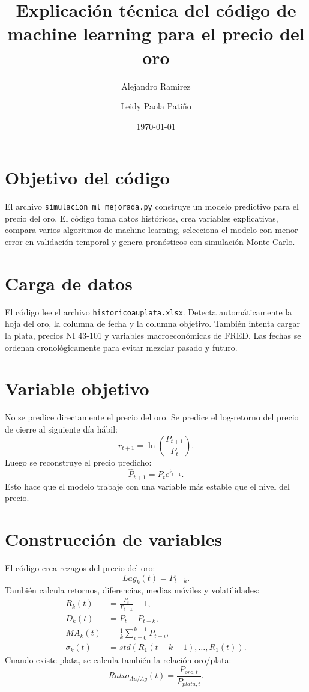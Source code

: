 \documentclass[12pt,letterpaper]{article}
\title{Explicación técnica del código de machine learning para el precio del oro}
\author{Alejandro Ramirez \and Leidy Paola Patiño}
\date{\today}
\begin{document}
\maketitle

\section{Objetivo del código}
El archivo \texttt{simulacion\_ml\_mejorada.py} construye un modelo predictivo para el precio del oro. El código toma datos históricos, crea variables explicativas, compara varios algoritmos de machine learning, selecciona el modelo con menor error en validación temporal y genera pronósticos con simulación Monte Carlo.

\section{Carga de datos}
El código lee el archivo \texttt{historicoauplata.xlsx}. Detecta automáticamente la hoja del oro, la columna de fecha y la columna objetivo. También intenta cargar la plata, precios NI 43-101 y variables macroeconómicas de FRED. Las fechas se ordenan cronológicamente para evitar mezclar pasado y futuro.

\section{Variable objetivo}
No se predice directamente el precio del oro. Se predice el log-retorno del precio de cierre al siguiente día hábil:
\begin{equation}
r_{t+1}=\ln\left(\frac{P_{t+1}}{P_t}\right).
\end{equation}
Luego se reconstruye el precio predicho:
\begin{equation}
\hat{P}_{t+1}=P_t e^{\hat{r}_{t+1}}.
\end{equation}
Esto hace que el modelo trabaje con una variable más estable que el nivel del precio.

\section{Construcción de variables}
El código crea rezagos del precio del oro:
\begin{equation}
Lag_k(t)=P_{t-k}.
\end{equation}
También calcula retornos, diferencias, medias móviles y volatilidades:
\begin{align}
R_k(t)&=\frac{P_t}{P_{t-k}}-1,\\
D_k(t)&=P_t-P_{t-k},\\
MA_k(t)&=\frac{1}{k}\sum_{i=0}^{k-1}P_{t-i},\\
\sigma_k(t)&=std(R_1(t-k+1),\ldots,R_1(t)).
\end{align}
Cuando existe plata, se calcula también la relación oro/plata:
\begin{equation}
Ratio_{Au/Ag}(t)=\frac{P_{oro,t}}{P_{plata,t}}.
\end{equation}
\end{document}
